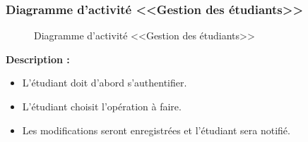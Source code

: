 \documentclass[12pt]{report}
\begin{document}
\newpage

\subsubsection{Diagramme d'activité <<Gestion des étudiants>>}

\begin{figure}[h]
\centering
    \centerline{}
    \caption{Diagramme d'activité <<Gestion des étudiants>>}
\end{figure}

\textbf{Description :}

\begin{itemize}
    \item L'étudiant doit d’abord s’authentifier.
    \item L'étudiant choisit l'opération à faire.
    \item Les modifications seront enregistrées et l’étudiant sera notifié.
\end{itemize}
\end{document}

